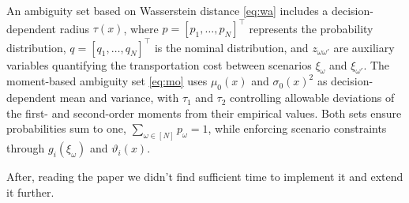 \documentclass[12pt, letterpaper]{article}
\begin{document}
			An ambiguity set based on Wasserstein distance \ref{eq:wa} includes a decision-dependent radius $\tau(x)$, where $p = [p_1, \ldots, p_N]^\top$ represents the probability distribution, $q = [q_1, \ldots, q_N]^\top$ is the nominal distribution, and $z_{\omega\omega'}$ are auxiliary variables quantifying the transportation cost between scenarios $\xi_\omega$ and $\xi_{\omega'}$. The moment-based ambiguity set \ref{eq:mo} uses $\mu_0(x)$ and $\sigma_0(x)^2$ as decision-dependent mean and variance, with $\tau_1$ and $\tau_2$ controlling allowable deviations of the first- and second-order moments from their empirical values. Both sets ensure probabilities sum to one, $\sum_{\omega \in [N]} p_\omega = 1$, while enforcing scenario constraints through $g_i(\xi_\omega)$ and $\vartheta_i(x)$. 
			
			After, reading the paper we didn't find sufficient time to implement it and extend it further. 
		
	\newpage
	\printglossary[type=\acronymtype]
	
	\clearpage
	
	
\end{document}

